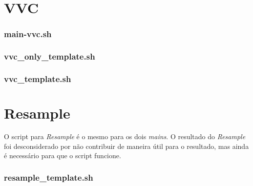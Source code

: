 \section{VVC}
\subsubsection{main-vvc.sh}


\subsubsection{vvc\_only\_template.sh}


\subsubsection{vvc\_template.sh}


\section{Resample}

O script para \textit{Resample} é o mesmo para os dois \textit{mains}.
O resultado do \textit{Resample} foi desconsiderado por não contribuir de maneira
útil para o resultado, mas ainda é necessário para que o script funcione.

\subsubsection{resample\_template.sh}
